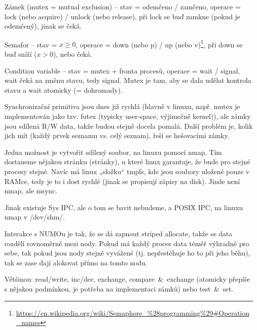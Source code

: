 \documentclass[12pt]{article}                   %
\begin{document}
        \begin{definice}
            Zámek (mutex = mutual exclusion) -- stav = odemčeno / zamčeno, operace = lock (nebo acquire) / unlock (nebo release), při lock se buď zamkne (pokud je odemčený), jinak se čeká.

            Semafor -- stav = $x ≥ 0$, operace = down (nebo p) / up (nebo v)\footnote{\url{https://en.wikipedia.org/wiki/Semaphore\_\%28programming\%29\#Operation\_names}}, při down se buď sníží ($x > 0$), nebo čeká.

            Condition variable -- stav = mutex + fronta procesů, operace = wait / signal, wait čeká na změnu stavu, tedy signal. Mutex je tam, aby se dala udělat kontrola stavu a wait atomicky (= dohromady).

            Synchronizační primitiva jsou dnes již rychlá (hlavně v linuxu, např. mutex je implementován jako tzv. futex (typicky user-space, výjimečně kernel)), ale zámky jsou sdílená R/W data, takže budou stejně docela pomalá. Další problém je, kolik jich mít (každý prvek seznamu vs. celý seznam), řeší se hešovacími zámky. 
        \end{definice}


        \begin{definice}
            Jedna možnost je vytvořit sdílený soubor, na linuxu pomocí nmap. Tím dostaneme nějakou stránku (stránky), u které linux garantuje, že bude pro stejné procesy stejné. Navíc má linux „složku“ tmpfs, kde jsou soubory uložené pouze v RAMce, tedy je to i dost rychlé (jinak se propisují zápisy na disk). Jinde není nmap, ale msync.

            Jinak existuje Sys IPC, ale o tom se bavit nebudeme, a POSIX IPC, na linuxu nmap v /dev/shm/.

            Interakce s NUMOu je tak, že se dá zapnout striped allocate, takže se data rozdělí rovnoměrně mezi nody. Pokud má každý proces data téměř výhradně pro sebe, tak pokud jsou nody stejně vyvážené (tj. nepřestěhuje ho to při jeho běhu), tak se zase dají alokovat přímo na tomto nodu.
        \end{definice}

        \begin{definice}
            Většinou: read/write, inc/dec, exchange, compare~\&~exchange (atomicky přepíše s nějakou podmínkou, je potřeba na implementaci zámků) nebo test~\&~set.
        \end{definice}
\end{document}
